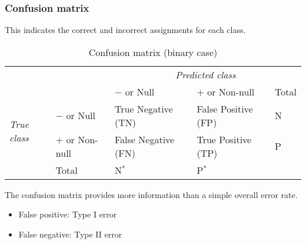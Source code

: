 \documentclass[smaller]{beamer}
\newcommand{\?}{\stackrel{?}{=}}
\newcommand{\rd}{\color{red}}
\newcommand{\bl}{\color{blue}}
\begin{document}
\begin{frame}
  \frametitle{Confusion matrix}
  \pause
  This indicates the correct and incorrect assignments for each class.\pause

  \begin{table}[h!]
    \centering \small
        \caption{Confusion matrix (binary case)}
    \label{tab:conf}
    \begin{tabular}{l l l l l}\toprule
      && \multicolumn{3}{c}{\it Predicted class} \\
      & & $-$ or Null & $+$ or Non-null & Total \\\midrule
      \multirow{2}{*}{\it True class}& $-$ or Null & \bl True Negative (TN) &\rd False Positive (FP) & N \\
                                    & $+$ or Non-null& \rd False Negative (FN) &  \bl True Positive (TP) & P \\\midrule
      & Total & N$^*$ & P$^*$ & \\\bottomrule
    \end{tabular}
  \end{table}
  \pause
  The confusion matrix provides more information than a simple overall error rate.\pause

  \begin{itemize}[<+->]
  \item False positive: Type I error
  \item False negative: Type II error
  \end{itemize}
\end{frame}
\end{document}
